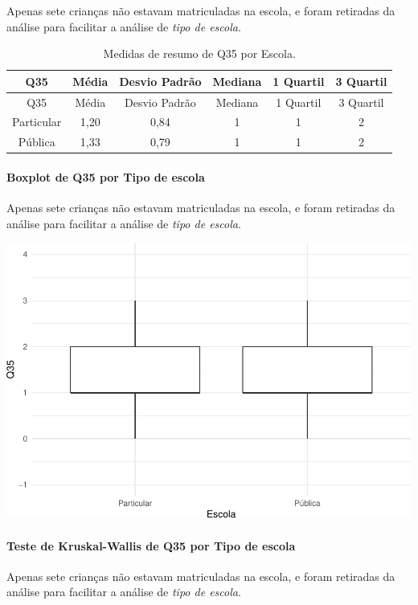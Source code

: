 \documentclass[]{article}
\let\oldparagraph\paragraph
\renewcommand{\paragraph}[1]{\oldparagraph{#1}\mbox{}}
\begin{document}
Apenas sete crianças não estavam matriculadas na escola, e foram retiradas da análise para facilitar a análise de \emph{tipo de escola}.

\begin{longtable}[]{@{}cccccc@{}}
\caption{\label{tab:unnamed-chunk-1296}Medidas de resumo de Q35 por Escola.}\tabularnewline
\toprule
Q35 & Média & Desvio Padrão & Mediana & 1 Quartil & 3 Quartil\tabularnewline
\midrule
\endfirsthead
\toprule
Q35 & Média & Desvio Padrão & Mediana & 1 Quartil & 3 Quartil\tabularnewline
\midrule
\endhead
Particular & 1,20 & 0,84 & 1 & 1 & 2\tabularnewline
Pública & 1,33 & 0,79 & 1 & 1 & 2\tabularnewline
\bottomrule
\end{longtable}

\hypertarget{boxplot-de-q35-por-tipo-de-escola}{%
\paragraph{Boxplot de Q35 por Tipo de escola}\label{boxplot-de-q35-por-tipo-de-escola}}

Apenas sete crianças não estavam matriculadas na escola, e foram retiradas da análise para facilitar a análise de \emph{tipo de escola}.

\begin{center}\includegraphics[width=0.75\linewidth]{relatorio_covid19_files/figure-latex/unnamed-chunk-1297-1} \end{center}

\hypertarget{teste-de-kruskal-wallis-de-q35-por-tipo-de-escola}{%
\paragraph{Teste de Kruskal-Wallis de Q35 por Tipo de escola}\label{teste-de-kruskal-wallis-de-q35-por-tipo-de-escola}}

Apenas sete crianças não estavam matriculadas na escola, e foram retiradas da análise para facilitar a análise de \emph{tipo de escola}.
\end{document}
